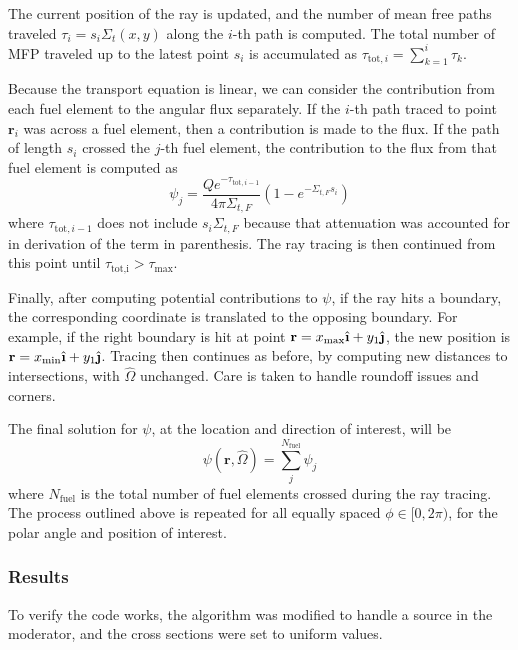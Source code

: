 \documentclass[12pt]{article}
\newcommand{\ihat}{\ensuremath{\hat{\textbf{\i}}}}
\newcommand{\jhat}{\ensuremath{\hat{\textbf{\j}}}}
\newenvironment{solution}[1][Solution]{\begin{trivlist}
\item[\hskip \labelsep {\bfseries #1} {\hspace{-0.2em}\bfseries:}]\hspace{0.3in}\newline}{\end{trivlist}}
\begin{document}
\begin{solution}
The current position of the ray is updated, and the number of mean free paths
traveled $\tau_i=s_i\Sigma_{t}(x,y)$ along the $i$-th path is computed. The total number of MFP
traveled up to the latest point $s_i$ is accumulated as
$\tau_{\text{tot},i}=\sum_{k=1}^i \tau_k$. 

Because the transport equation is linear, we can consider the
contribution from each fuel element to the angular flux separately. If the $i$-th path
traced to point $\mathbf{r}_i$ was across a fuel element, then a contribution is made
to the flux.  If the path of length $s_i$ crossed the $j$-th fuel element, the contribution to the flux from that fuel element is
computed as
\begin{equation}
    \psi_j =
    \frac{Qe^{-\tau_{\text{tot},i-1}}}{4\pi\Sigma_{t,F}}\left(1-e^{-\Sigma_{t,F}s_i}\right)
\end{equation}
where $\tau_{\text{tot},i-1}$ does not include $s_i\Sigma_{t,F}$ because
that attenuation was accounted for in derivation of the term in parenthesis. The
ray tracing is then continued from this point until $\tau_{\text{tot,i}} >
\tau_{\max}$. 

Finally, after computing potential contributions to $\psi$, if the ray hits a boundary, the corresponding coordinate is
translated to the opposing boundary.  For example, if the right boundary is hit at
point $\mathbf{r}=x_{\max}\ihat+y_1\jhat$, the new position is $\mathbf{r} =
x_{\min}\ihat + y_1\jhat$. Tracing then continues as before, by computing new
distances to intersections, with $\hat{\Omega}$ unchanged.  Care is taken to handle roundoff issues and corners.  

The final solution for $\psi$, at
the location and direction of interest, will be 
\begin{equation}
    \psi(\mathbf{r},\hat{\Omega}) = \sum_{j}^{N_{\text{fuel}}} \psi_j
\end{equation}
where $N_{\text{fuel}}$ is the total number of fuel elements crossed during the ray
tracing.  The process outlined above is repeated for all equally spaced
$\phi\in[0,2\pi)$, for the polar angle and position of interest.

\clearpage
\subsubsection*{Results}


To verify the code works, the algorithm was modified to handle a source in the
moderator, and the cross sections were set to uniform values.


\end{solution}
\end{document}
